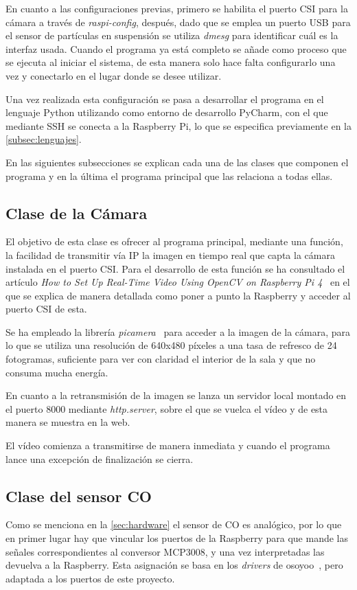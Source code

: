 En cuanto a las configuraciones previas, primero se habilita el puerto CSI para la cámara a través de \textit{raspi-config}, después, dado que se emplea un puerto USB para el sensor de partículas en suspensión se utiliza \textit{dmesg} para identificar cuál es la interfaz usada. Cuando el programa ya está completo se añade como proceso que se ejecuta al iniciar el sistema, de esta manera solo hace falta configurarlo una vez y conectarlo en el lugar donde se desee utilizar.
\pagebreak

Una vez realizada esta configuración se pasa a desarrollar el programa en el lenguaje Python utilizando como entorno de desarrollo PyCharm, con el que mediante SSH se conecta a la Raspberry Pi, lo que se especifica previamente en la \autoref{subsec:lenguajes}.

En las siguientes subsecciones se explican cada una de las clases que componen el programa y en la última el programa principal que las relaciona a todas ellas.

\subsection{Clase de la Cámara}\label{subsec:clase-de-la-cámara}
El objetivo de esta clase es ofrecer al programa principal, mediante una función, la facilidad de transmitir vía IP la imagen en tiempo real que capta la cámara instalada en el puerto CSI. Para el desarrollo de esta función se ha consultado el artículo \textit{How to Set Up Real-Time Video Using OpenCV on Raspberry Pi 4}~\cite{addison_how_nodate} en el que se explica de manera detallada como poner a punto la Raspberry y acceder al puerto CSI de esta.

Se ha empleado la librería \textit{picamera}~\cite{jones_picamera_nodate} para acceder a la imagen de la cámara, para lo que se utiliza una resolución de 640x480 píxeles a una tasa de refresco de 24 fotogramas, suficiente para ver con claridad el interior de la sala y que no consuma mucha energía.

En cuanto a la retransmisión de la imagen se lanza un servidor local montado en el puerto 8000 mediante \textit{http.server}, sobre el que se vuelca el vídeo y de esta manera se muestra en la web.

El vídeo comienza a transmitirse de manera inmediata y cuando el programa lance una excepción de finalización se cierra.

\subsection{Clase del sensor CO}\label{subsec:clase-del-sensor-co}
Como se menciona en la \autoref{sec:hardware} el sensor de CO es analógico, por lo que en primer lugar hay que vincular los puertos de la Raspberry para que mande las señales correspondientes al conversor MCP3008, y una vez interpretadas las devuelva a la Raspberry. Esta asignación se basa en los \textit{drivers} de osoyoo~\cite{osoyoo_osoyoodriver_2021}, pero adaptada a los puertos de este proyecto.

